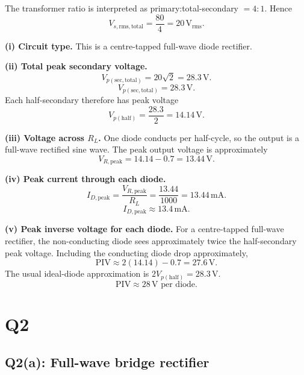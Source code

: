 \documentclass[11pt,a4paper]{article}
\newcommand{\rms}{\mathrm{rms}}
\newcommand{\unit}[1]{\,\mathrm{#1}}
\newcommand{\answerbox}[1]{\[\boxed{#1}\]}
\begin{document}
The transformer ratio is interpreted as primary:total-secondary $=4:1$. Hence
\[
V_{s,\rms,\mathrm{total}}=\frac{80}{4}=20\unit{V_{rms}}.
\]

\textbf{(i) Circuit type.} This is a centre-tapped full-wave diode rectifier.

\textbf{(ii) Total peak secondary voltage.}
\[
V_{p(\mathrm{sec,total})}=20\sqrt{2}=28.3\unit{V}.
\]
\answerbox{V_{p(\mathrm{sec,total})}=28.3\unit{V}.}
Each half-secondary therefore has peak voltage
\[
V_{p(\mathrm{half})}=\frac{28.3}{2}=14.14\unit{V}.
\]

\textbf{(iii) Voltage across $R_L$.} One diode conducts per half-cycle, so the output is a full-wave rectified sine wave. The peak output voltage is approximately
\[
V_{R,\mathrm{peak}}=14.14-0.7=13.44\unit{V}.
\]

\begin{center}
\end{center}

\textbf{(iv) Peak current through each diode.}
\[
I_{D,\mathrm{peak}}=\frac{V_{R,\mathrm{peak}}}{R_L}
=\frac{13.44}{1000}=13.44\unit{mA}.
\]
\answerbox{I_{D,\mathrm{peak}}\approx 13.4\unit{mA}.}

\textbf{(v) Peak inverse voltage for each diode.} For a centre-tapped full-wave rectifier, the non-conducting diode sees approximately twice the half-secondary peak voltage. Including the conducting diode drop approximately,
\[
\mathrm{PIV}\approx 2(14.14)-0.7=27.6\unit{V}.
\]
The usual ideal-diode approximation is $2V_{p(\mathrm{half})}=28.3\unit{V}$.
\answerbox{\mathrm{PIV}\approx 28\unit{V}\text{ per diode}.}

\newpage
\section*{Q2}

\subsection*{Q2(a): Full-wave bridge rectifier}
\end{document}
